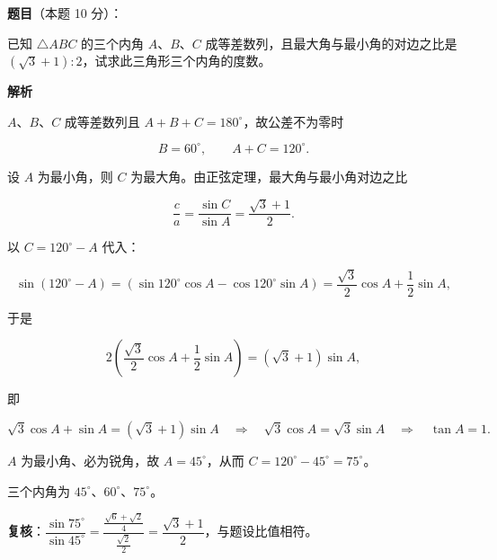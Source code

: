 \begin{answer}

\textbf{题目}（本题 10 分）：

已知 $\triangle ABC$ 的三个内角 $A\text{、}B\text{、}C$ 成等差数列，且最大角与最小角的对边之比是 $(\sqrt3+1):2$，试求此三角形三个内角的度数。

\textbf{解析}

$A\text{、}B\text{、}C$ 成等差数列且 $A+B+C=180^\circ$，故公差不为零时

\nopagebreak[4]
\[
B=60^\circ,
\qquad
A+C=120^\circ.
\]

设 $A$ 为最小角，则 $C$ 为最大角。由正弦定理，最大角与最小角对边之比

\nopagebreak[4]
\[
\frac{c}{a}=\frac{\sin C}{\sin A}=\frac{\sqrt3+1}{2}.
\]

以 $C=120^\circ-A$ 代入：

\nopagebreak[4]
\[
\sin(120^\circ-A)=(\sin120^\circ\cos A-\cos120^\circ\sin A)
=\frac{\sqrt3}{2}\cos A+\frac12\sin A,
\]

于是

\nopagebreak[4]
\[
2\left(\frac{\sqrt3}{2}\cos A+\frac12\sin A\right)=(\sqrt3+1)\sin A,
\]

即

\nopagebreak[4]
\[
\sqrt3\cos A+\sin A=(\sqrt3+1)\sin A
\quad\Longrightarrow\quad
\sqrt3\cos A=\sqrt3\sin A
\quad\Longrightarrow\quad
\tan A=1.
\]

$A$ 为最小角、必为锐角，故 $A=45^\circ$，从而 $C=120^\circ-45^\circ=75^\circ$。

三个内角为 $45^\circ$、$60^\circ$、$75^\circ$。

\begin{gktip}
\textbf{复核}：$\dfrac{\sin75^\circ}{\sin45^\circ}=\dfrac{\frac{\sqrt6+\sqrt2}{4}}{\frac{\sqrt2}{2}}=\dfrac{\sqrt3+1}{2}$，与题设比值相符。
\end{gktip}


\end{answer}
